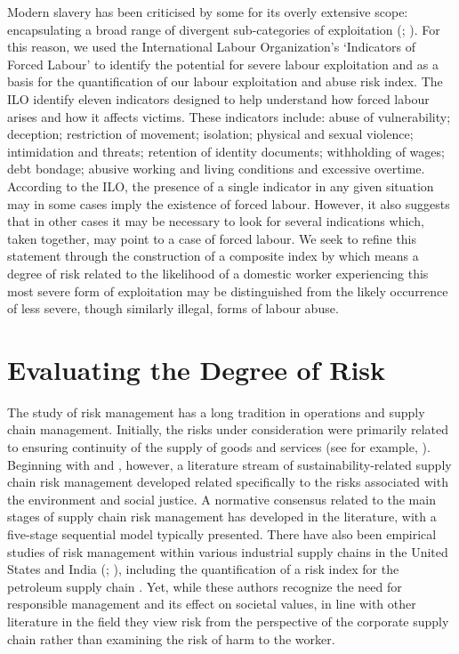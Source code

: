 \documentclass[
  12pt,
  letterpaper,
  DIV=11,
  numbers=noendperiod]{scrartcl}
\theoremstyle{plain}
\theoremstyle{definition}
\begin{document}
Modern slavery has been criticised by some for its overly extensive
scope: encapsulating a broad range of divergent sub-categories of
exploitation (\textcite{oconnell_davidson_margins_2015};
\textcite{gutierrez-huerter_o_change_2023}). For this reason, we used
the International Labour Organization's \autocite{ILO11-indicators}
`Indicators of Forced Labour' to identify the potential for severe
labour exploitation and as a basis for the quantification of our labour
exploitation and abuse risk index. The ILO identify eleven indicators
designed to help understand how forced labour arises and how it affects
victims. These indicators include: abuse of vulnerability; deception;
restriction of movement; isolation; physical and sexual violence;
intimidation and threats; retention of identity documents; withholding
of wages; debt bondage; abusive working and living conditions and
excessive overtime. According to the ILO, the presence of a single
indicator in any given situation may in some cases imply the existence
of forced labour. However, it also suggests that in other cases it may
be necessary to look for several indications which, taken together, may
point to a case of forced labour. We seek to refine this statement
through the construction of a composite index by which means a degree of
risk related to the likelihood of a domestic worker experiencing this
most severe form of exploitation may be distinguished from the likely
occurrence of less severe, though similarly illegal, forms of labour
abuse.

\section{Evaluating the Degree of
Risk}\label{evaluating-the-degree-of-risk}

The study of risk management has a long tradition in operations and
supply chain management. Initially, the risks under consideration were
primarily related to ensuring continuity of the supply of goods and
services (see for example, \textcite{juttner_supply_2003}). Beginning
with \textcite{anderson_critical_2006} and
\textcite{anderson_sustainability_2009}, however, a literature stream of
sustainability-related supply chain risk management developed related
specifically to the risks associated with the environment and social
justice. A normative consensus related to the main stages of supply
chain risk management has developed in the literature, with a five-stage
sequential model typically presented. There have also been empirical
studies of risk management within various industrial supply chains in
the United States and India (\textcite{tarei_hybrid_2018};
\textcite{dellana_scale_2021}), including the quantification of a risk
index for the petroleum supply chain \autocite{tarei_hybrid_2018}. Yet,
while these authors recognize the need for responsible management and
its effect on societal values, in line with other literature in the
field they view risk from the perspective of the corporate supply chain
rather than examining the risk of harm to the worker.
\end{document}

